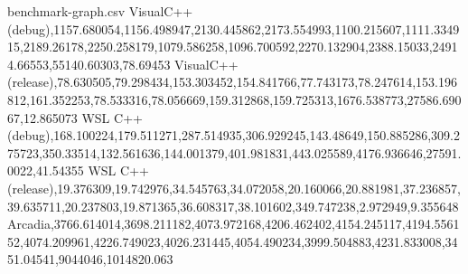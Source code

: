 \begin{filecontents*}{benchmark-graph.csv}
VisualC++ (debug),1157.680054,1156.498947,2130.445862,2173.554993,1100.215607,1111.334915,2189.26178,2250.258179,1079.586258,1096.700592,2270.132904,2388.15033,24914.66553,55140.60303,78.69453
VisualC++ (release),78.630505,79.298434,153.303452,154.841766,77.743173,78.247614,153.196812,161.352253,78.533316,78.056669,159.312868,159.725313,1676.538773,27586.69067,12.865073
WSL C++ (debug),168.100224,179.511271,287.514935,306.929245,143.48649,150.885286,309.275723,350.33514,132.561636,144.001379,401.981831,443.025589,4176.936646,27591.0022,41.54355
WSL C++ (release),19.376309,19.742976,34.545763,34.072058,20.160066,20.881981,37.236857,39.635711,20.237803,19.871365,36.608317,38.101602,349.747238,2.972949,9.355648
Arcadia,3766.614014,3698.211182,4073.972168,4206.462402,4154.245117,4194.556152,4074.209961,4226.749023,4026.231445,4054.490234,3999.504883,4231.833008,3451.04541,9044046,1014820.063
\end{filecontents*}
